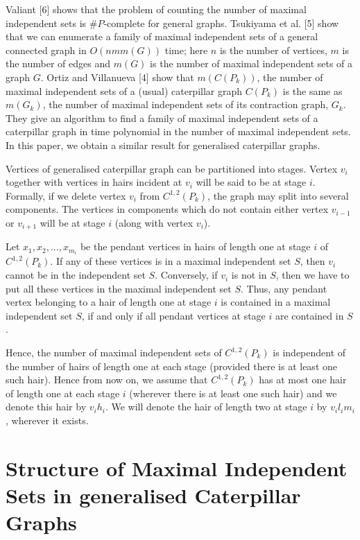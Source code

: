 \documentclass[10pt]{article}
\begin{document}
Valiant [6] shows that the problem of counting the number of maximal
independent sets is $\# P$-complete for general graphs. Tsukiyama et al.
[5] show that we can enumerate a family of maximal independent sets of a
general connected graph in $O(n m m(G))$ time; here $n$ is the number of
vertices, $m$ is the number of edges and $m(G)$ is the number of maximal
independent sets of a graph $G$. Ortiz and Villanueva [4] show that
$m(C(P_k))$, the number of maximal independent sets of a (usual)
caterpillar graph $C(P_k)$ is the same as $m(G_k)$, the number of maximal
independent sets of its contraction graph, $G_k$.  They give an algorithm
to find a family of maximal independent sets of a caterpillar graph in
time polynomial in the number of maximal independent sets. In this paper,
we obtain a similar result for generalised caterpillar graphs. 

Vertices of generalised caterpillar graph can be partitioned into stages.
Vertex $v_i$ together with vertices in hairs incident at $v_i$ will be
said to be at stage $i$. Formally, if we delete vertex $v_i$ from
$C^{1,2}(P_k)$, the graph may split into several components. The vertices
in components which do not contain either vertex $v_{i-1}$ or $v_{i+1}$
will be at stage $i$ (along with vertex $v_i$). 

Let $x_1,x_2, ..., x_{m_i}$ be the pendant vertices in hairs of length
one at stage $i$ of $C^{1,2}(P_k)$. If any of these vertices is in a
maximal independent set $S$, then $v_i$ cannot be in the independent set
$S$. Conversely, if $v_i$ is not in $S$, then we have to put all these
vertices in the maximal independent set $S$. Thus, any pendant vertex
belonging to a hair of length one at stage $i$ is contained in a maximal
independent set $S$, if and only if all pendant vertices at stage $i$ are
contained in $S$.

Hence, the number of maximal independent sets of $C^{1,2}(P_k)$ is
independent of the number of hairs of length one at each stage (provided
there is at least one such hair).  Hence from now on, we assume that
$C^{1,2}(P_k)$ has at most one hair of length one at each stage $i$
(wherever there is at least one such hair) and we denote this hair by
$v_ih_i$.  We will denote the hair of length two at stage $i$ by
$v_il_im_i$, wherever it exists.


\section{Structure of Maximal Independent Sets in generalised Caterpillar
Graphs}
\end{document}
